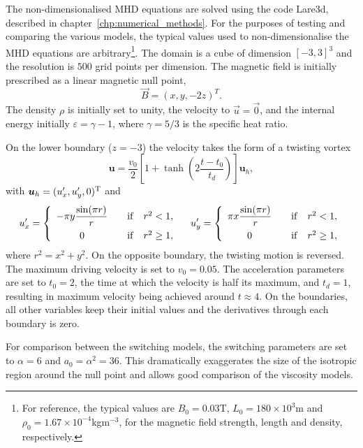 The non-dimensionalised MHD equations are solved using the code Lare3d, described in chapter~\ref{chp:numerical_methods}. For the purposes of testing and comparing the various models, the typical values used to non-dimensionalise the MHD equations are arbitrary\footnote{For reference, the typical values are $B_0 = 0.03$T, $L_0 = 180\times10^{3}$m and $\rho_0 = 1.67\times10^{-4}$kgm$^{-3}$, for the magnetic field strength, length and density, respectively.}. The domain is a cube of dimension $[-3, 3]^3$ and the resolution is $500$ grid points per dimension. The magnetic field is initially prescribed as a linear magnetic null point,
\begin{equation}
  \label{eq:null_mag_field}
\vec{B} = (x, y, -2z)^T.
\end{equation}
The density $\rho$ is initially set to unity, the velocity to $\vec{u} = \vec{0}$, and the internal energy initially $\varepsilon = \gamma-1$, where $\gamma = 5/3$ is the specific heat ratio.

On the lower boundary ($z=-3$) the velocity takes the form of a twisting vortex
\begin{equation}\label{ramp}
\boldsymbol{u} = \frac{v_0}{2}\left[1+\tanh\left(2\frac{t-t_0}{t_d}\right)\right]\boldsymbol{u}_h,
\end{equation}
with $\boldsymbol{u}_h = (u_x',u_y',0)^{\rm T}$ and
\begin{equation}\label{vprime}
u_x' = \left\{\begin{array}{cc}
-\pi y\displaystyle\frac{\sin(\pi r)}{r} &\quad{\rm if}\quad r^2<1, \\[8pt]
\displaystyle 0 &\quad{\rm if}\quad r^2 \ge 1,
\end{array}\right. \quad
u_y' = \left\{\begin{array}{cc}
\pi x\displaystyle\frac{\sin(\pi r)}{r} &\quad{\rm if}\quad r^2<1, \\[8pt]
\displaystyle 0 &\quad{\rm if}\quad r^2 \ge 1,
\end{array}\right.
\end{equation}
where $r^2=x^2+y^2$. On the opposite boundary, the twisting motion is reversed. The maximum driving velocity is set to $v_0 = 0.05$. The acceleration parameters are set to $t_0 = 2$, the time at which the velocity is half its maximum, and $t_d = 1$, resulting in maximum velocity being achieved around $t\approx4$. On the boundaries, all other variables keep their initial values and the derivatives through each boundary is zero.

For comparison between the switching models, the switching parameters are set to $\alpha = 6$ and $a_0 = \alpha^2 = 36$. This dramatically exaggerates the size of the isotropic region around the null point and allows good comparison of the viscosity models.

